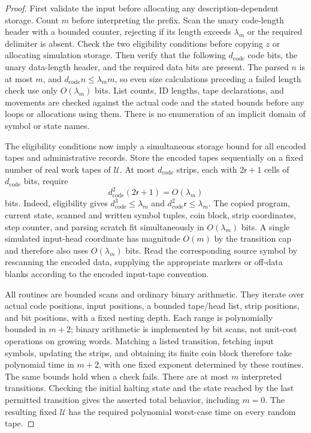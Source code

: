 \documentclass[11pt]{article}
\numberwithin{equation}{section}
\theoremstyle{definition}
\theoremstyle{remark}
\begin{document}
\begin{proof}
First validate the input before allocating any description-dependent storage. Count $m$ before interpreting the prefix.  Scan the unary code-length
header with a bounded counter, rejecting if its length exceeds
$\lambda_m$ or the required delimiter is absent.  Check the two
eligibility conditions before copying $z$ or allocating simulation
storage.  Then verify that the following $d_{\mathrm{code}}$ code bits,
the unary data-length header, and the required data bits are present.
The parsed $n$ is at most $m$, and
$d_{\mathrm{code}}n\le\lambda_m m$, so even size calculations preceding
a failed length check use only $O(\lambda_m)$ bits.  List counts, ID
lengths, tape declarations, and movements are checked against the actual
code and the stated bounds before any loops or allocations using them.
There is no enumeration of an implicit domain of symbol or state names.

The eligibility conditions now imply a simultaneous storage bound for all encoded tapes and administrative records. Store the encoded tapes sequentially on a fixed number of real work
tapes of ${\mathcal{U}}$.  At most $d_{\mathrm{code}}$ strips, each with $2{\mathsf{r}}+1$
cells of $d_{\mathrm{code}}$ bits, require
\begin{equation}\label{eq:compiler-interpreter-space}
 d_{\mathrm{code}}^2(2{\mathsf{r}}+1)=O(\lambda_m)
\end{equation}
bits.  Indeed, eligibility gives
$d_{\mathrm{code}}^3\le\lambda_m$ and
$d_{\mathrm{code}}^2{\mathsf{r}}\le\lambda_m$.
The copied program, current state, scanned and written symbol tuples,
coin block, strip coordinates, step counter, and parsing scratch fit
simultaneously in $O(\lambda_m)$ bits.  A single simulated input-head
coordinate has magnitude $O(m)$ by the transition cap and therefore
also uses $O(\lambda_m)$ bits.  Read the corresponding source symbol
by rescanning the encoded data, supplying the appropriate markers or
off-data blanks according to the encoded input-tape convention.

All routines are bounded scans and ordinary binary arithmetic.  They
iterate over actual code positions, input positions, a bounded tape/head
list, strip positions, and bit positions, with a fixed nesting depth.
Each range is polynomially bounded in $m+2$; binary arithmetic is
implemented by bit scans, not unit-cost operations on growing words.
Matching a listed transition, fetching input symbols, updating the
strips, and obtaining its finite coin block therefore take polynomial
time in $m+2$, with one fixed exponent determined by these routines.
The same bounds hold when a check fails.  There are at most $m$
interpreted transitions.  Checking the initial halting state and the
state reached by the last permitted transition gives the asserted
total behavior, including $m=0$.  The resulting fixed ${\mathcal{U}}$ has the
required polynomial worst-case time on every random tape.
\end{proof}
\end{document}

